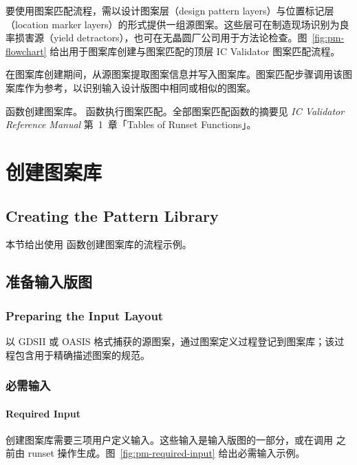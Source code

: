 要使用图案匹配流程，需以设计图案层（design pattern layers）与位置标记层（location marker layers）的形式提供一组源图案。这些层可在制造现场识别为良率损害源（yield detractors），也可在无晶圆厂公司用于方法论检查。图~\ref{fig:pm-flowchart} 给出用于图案库创建与图案匹配的顶层 IC Validator 图案匹配流程。


在图案库创建期间，从源图案提取图案信息并写入图案库。图案匹配步骤调用该图案库作为参考，以识别输入设计版图中相同或相似的图案。

 函数创建图案库。 函数执行图案匹配。全部图案匹配函数的摘要见 \textit{IC Validator Reference Manual} 第~1~章「Tables of Runset Functions」。

\section{创建图案库}
\subsection*{Creating the Pattern Library}

本节给出使用  函数创建图案库的流程示例。

\subsection{准备输入版图}
\subsubsection*{Preparing the Input Layout}

以 GDSII 或 OASIS 格式捕获的源图案，通过图案定义过程登记到图案库；该过程包含用于精确描述图案的规范。

\subsubsection{必需输入}
\paragraph*{Required Input}

创建图案库需要三项用户定义输入。这些输入是输入版图的一部分，或在调用  之前由 runset 操作生成。图~\ref{fig:pm-required-input} 给出必需输入示例。

